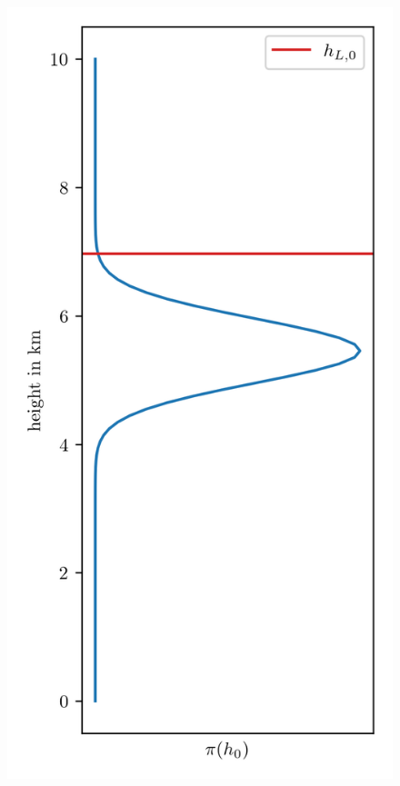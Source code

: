 \begin{figure}[ht!]
	\centering
	\includegraphics{HeightPressPriors.png}
	\caption[]{}
	\label{fig:HeightPressPriors}
\end{figure}


